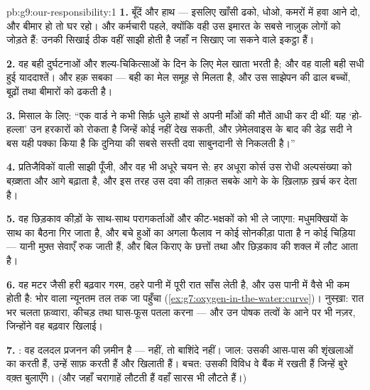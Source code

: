 \begin{solution}{pb:g9:our-responsibility:1}
\textbf{1.} बूँदें और हाथ --- इसलिए खाँसी ढको, धोओ, कमरों में हवा आने
दो, और बीमार हो तो घर रहो। और कर्मचारी पहले, क्योंकि वही उस इमारत के सबसे
नाज़ुक लोगों को जोड़ते हैं: उनकी सिखाई ठीक वहीं साझी होती है जहाँ न सिखाए
जा सकने वाले इकट्ठा हैं।

\textbf{2.} वह बही दुर्घटनाओं और शल्य-चिकित्साओं के दिन के लिए मेल खाता
 भरती है; और वह  वाली बही सधी हुई याददाश्तें। और हक़ सबका ---
बही का मेल समूह से मिलता है, और उस साझेपन की ढाल बच्चों, बूढ़ों तथा
बीमारों को ढकती है।

\textbf{3.} मिसाल के लिए: ``एक वार्ड ने कभी सिर्फ़ धुले हाथों से अपनी
माँओं की मौतें आधी कर दी थीं: यह `हो-हल्ला' उन हरकारों को रोकता है
जिन्हें कोई  नहीं देख सकती, और ज़ेमेलवाइस के बाद की डेढ़ सदी ने बस यही
पक्का किया है कि दुनिया की सबसे सस्ती दवा साबुनदानी से निकलती है।''

\textbf{4.} प्रतिजैविकों वाली साझी पूँजी, और वह भी अधूरे चयन से: हर अधूरा
कोर्स उस रोधी अल्पसंख्या को बख़्शता और आगे बढ़ाता है, और इस तरह उस दवा
की ताक़त सबके आगे के  के ख़िलाफ़ ख़र्च कर देता है।

\textbf{5.} वह छिड़काव कीड़ों के साथ-साथ परागकर्ताओं और कीट-भक्षकों को भी
ले जाएगा: मधुमक्खियों के साथ  का बैठना गिर जाता है, और बचे हुओं का अगला
फैलाव न कोई सोनकीड़ा पाता है न कोई चिड़िया --- यानी मुफ़्त सेवाएँ रुक
जाती हैं, और बिल किराए के छत्तों तथा और छिड़काव की शक्ल में लौट आता है।

\textbf{6.} वह मटर जैसी हरी बढ़वार गरम, ठहरे पानी में पूरी रात साँस लेती
है, और उस पानी में  वैसे भी कम होती है: भोर वाला न्यूनतम तल तक जा
पहुँचा (\cref{ex:g7:oxygen-in-the-water:curve})। नुस्ख़ा: रात भर चलता
फ़व्वारा, कीचड़ तथा घास-फूस पतला करना --- और उन पोषक तत्वों के आने पर भी
नज़र, जिन्होंने वह बढ़वार खिलाई।

\textbf{7.} : वह दलदल प्रजनन की ज़मीन है ---  नहीं, तो बाशिंदे
नहीं। जाल: उसकी  आस-पास की शृंखलाओं का  करती हैं, उन्हें
साफ़ करती हैं और खिलाती हैं। बचत: उसकी विविध  वे  बैंक
में रखती हैं जिन्हें बुरे वक़्त बुलाएँगे। (और जहाँ चरागाहें लौटती हैं
वहाँ सारस भी लौटते हैं।)


\end{solution}
